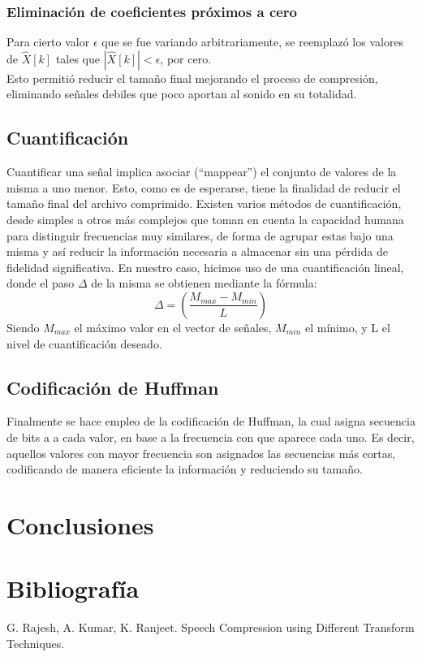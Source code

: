 \documentclass[a4paper,11pt]{article}
\begin{document}
\subsubsection{Eliminación de coeficientes próximos a cero}
Para cierto valor $\epsilon$ que se fue variando arbitrariamente, se reemplazó
los valores de $\hat{X}[k]$ tales que $|\hat{X}[k]| < \epsilon$, por cero. \\
Esto permitió reducir el tamaño final mejorando el proceso de compresión,
eliminando señales debiles que poco aportan al sonido en su totalidad.
\subsection{Cuantificación}
Cuantificar una señal implica asociar (``mappear'') el conjunto de valores de la
misma a uno menor. Esto, como es de esperarse, tiene la finalidad de
reducir el tamaño final del archivo comprimido. Existen varios métodos de
cuantificación, desde simples a otros más complejos que toman en cuenta la
capacidad humana para distinguir frecuencias muy similares, de forma de agrupar
estas bajo una misma y así reducir la información necesaria a almacenar sin una
pérdida de fidelidad significativa. En nuestro caso, hicimos uso de una
cuantificación lineal, donde el paso $\Delta$ de la misma se obtienen
mediante la fórmula:
$$\Delta = \left(\frac{M_{max} - M_{min}}{L}\right)$$
Siendo $M_{max}$ el máximo valor en el vector de señales, $M_{min}$ el mínimo,
y L el nivel de cuantificación deseado.
\subsection{Codificación de Huffman}
Finalmente se hace empleo de la codificación de Huffman, la cual asigna
secuencia de bits a a cada valor, en base a la frecuencia con que aparece cada
uno. Es decir, aquellos valores con mayor frecuencia son asignados las
secuencias más cortas, codificando de manera eficiente la información y
reduciendo su tamaño.
\section{Conclusiones}
\paragraph{}
\newpage
\section{Bibliograf\'ia}
G. Rajesh, A. Kumar, K. Ranjeet. Speech Compression using Different Transform Techniques.
\end{document}
